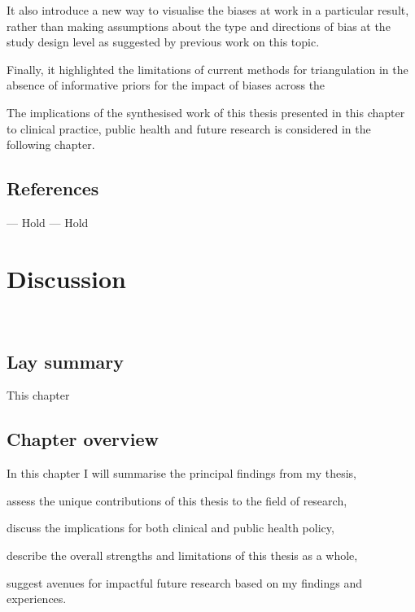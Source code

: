 \documentclass[a4paper, twoside]{templates/ociamthesis}
\begin{document}
It also introduce a new way to visualise the biases at work in a particular result, rather than making assumptions about the type and directions of bias at the study design level as suggested by previous work on this topic.

Finally, it highlighted the limitations of current methods for triangulation in the absence of informative priors for the impact of biases across the

The implications of the synthesised work of this thesis presented in this chapter to clinical practice, public health and future research is considered in the following chapter.

\newpage

\hypertarget{references-5}{%
\section{References}\label{references-5}}

--- Hold --- Hold

\hypertarget{discussion-heading}{%
\chapter{Discussion}\label{discussion-heading}}

\minitoc 

~

\hypertarget{lay-summary-6}{%
\section{Lay summary}\label{lay-summary-6}}

This chapter

\hypertarget{chapter-overview}{%
\section{Chapter overview}\label{chapter-overview}}

In this chapter I will summarise the principal findings from my thesis,

assess the unique contributions of this thesis to the field of research,

discuss the implications for both clinical and public health policy,

describe the overall strengths and limitations of this thesis as a whole,

suggest avenues for impactful future research based on my findings and experiences.
\end{document}
